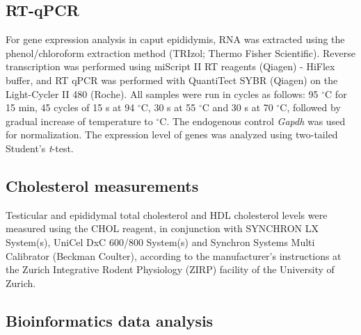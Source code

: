 \documentclass[12pt,twoside]{reedthesis}
\begin{document}
\hypertarget{rt-qpcr}{%
\subsection{RT-qPCR}\label{rt-qpcr}}

For gene expression analysis in caput epididymis, RNA was extracted
using the phenol/chloroform extraction method (TRIzol; Thermo Fisher
Scientific). Reverse transcription was performed using miScript \RN{2}
RT reagents (Qiagen) - HiFlex buffer, and RT qPCR was performed with
QuantiTect SYBR (Qiagen) on the Light-Cycler \RN{2} 480 (Roche). All
samples were run in cycles as follows: 95 \(^{\circ}\)C for 15 min, 45
cycles of 15 s at 94 \(^{\circ}\)C, 30 s at 55 \(^{\circ}\)C and 30 s at 70
\(^{\circ}\)C, followed by gradual increase of temperature to \(^{\circ}\)C.
The endogenous control \textit{Gapdh} was used for normalization. The
expression level of genes was analyzed using two-tailed Student's
\textit{t}-test.

\hypertarget{cholesterol-measurements}{%
\subsection{Cholesterol measurements}\label{cholesterol-measurements}}

Testicular and epididymal total cholesterol and HDL cholesterol levels
were measured using the CHOL reagent, in conjunction with SYNCHRON LX
System(s), UniCel DxC 600/800 System(s) and Synchron Systems Multi
Calibrator (Beckman Coulter), according to the manufacturer's
instructions at the Zurich Integrative Rodent Physiology (ZIRP) facility
of the University of Zurich.

\hypertarget{bioinformatics-data-analysis}{%
\subsection{Bioinformatics data analysis}\label{bioinformatics-data-analysis}}
\end{document}
